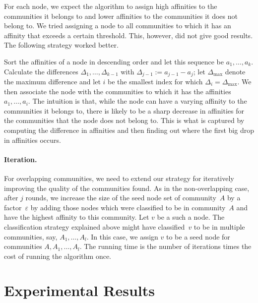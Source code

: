 For each node, we expect the algorithm to assign high affinities to the communities 
it belongs to and lower affinities to the communities it does not belong to. 
We tried assigning a node to all communities to which it has an affinity that 
exceeds a certain threshold. This, however, did not give good results.
The following strategy worked better. 

Sort the affinities of a node in descending order and let this 
sequence be $a_1, \ldots, a_k$. Calculate the differences 
$\Delta_{1}, \ldots, \Delta_{k-1}$ with $\Delta_{j-1} := a_{j - 1} - a_j$;
let $\Delta_{\mathrm{max}}$ denote the maximum difference 
and let $i$ be the smallest index for which $\Delta_i = \Delta_{\mathrm{max}}$. We then associate 
the node with the communities to which it has the affinities $a_1, \ldots, a_i$. 
The intuition is that, while the node can have a varying affinity to the communities it belongs to, 
there is likely to be a sharp decrease in affinities for the communities that the node does 
not belong to. This is what is captured by computing the difference in affinities and then finding 
out where the first big drop in affinities occurs.

\paragraph{Iteration.}
For overlapping communities, we need to extend our strategy for iteratively improving the quality 
of the communities found. As in the non-overlapping case, after $j$ rounds, we increase the 
size of the seed node set of community~$A$ by a factor~$\varepsilon$ by adding those nodes 
which were classified to be in community~$A$ and have the highest affinity to this community. 
Let $v$ be a such a node. The classification strategy explained above might have classified~$v$ 
to be in multiple communities, say, $A_1, \dots, A_l$. In this case, we assign $v$ 
to be a seed node for communities $A, A_1, \ldots, A_l$. The running time is the number of 
iterations times the cost of running the algorithm once.











\section{Experimental Results}
\newcommand{\appplotwidth}{\linewidth}

